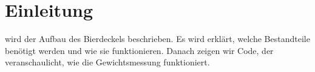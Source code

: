 \documentclass[12pt,journal]{IEEEtran}
\begin{document}
\section{Einleitung}

% 
% 
% 
% 
 wird der Aufbau des Bierdeckels beschrieben.
Es wird erklärt, welche Bestandteile benötigt werden und wie sie funktionieren.
Danach zeigen wir Code, der veranschaulicht, wie die Gewichtsmessung funktioniert.
\end{document}
